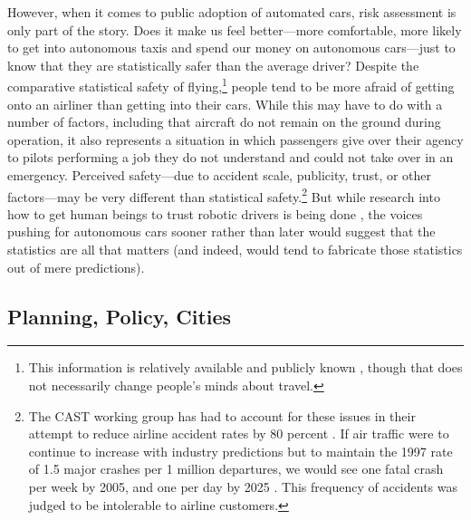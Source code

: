 However, when it comes to public adoption of automated cars,
risk assessment is only part of the story. Does it make us feel better---more
comfortable, more likely to get into autonomous taxis and spend our
money on autonomous cars---just to know that they are statistically safer
than the average driver? Despite the comparative
statistical safety of flying,\footnote{This information is relatively
  available and publicly known \cite{airlinereporter}, though that does not
  necessarily change people's minds about travel.}
people tend to be more afraid of getting onto an airliner than getting into their
cars. While this may have to do with a number of factors,
including that aircraft do not remain on the ground during operation,
it also represents a situation in which passengers give over their
agency to pilots performing a job they do not understand and could not
take over in an emergency. Perceived safety---due to accident scale,
publicity, trust, or other factors---may be very different than statistical
safety.\footnote{The CAST working group has had to account for these
  issues in their attempt to reduce airline accident rates by 80 percent \cite[p.
    28]{PARCCAST}.
If air traffic were to continue to increase
with industry predictions but to maintain the 1997 rate of 1.5 major
crashes per 1 million departures, we would see one fatal crash per
week by 2005, and one per day by 2025 \cite{predictmorecrashes}.
This frequency of accidents was judged to be intolerable to
airline customers.} But while research into how to get human beings to trust robotic drivers
is being done \cite{rossTrust}, the voices pushing for autonomous cars sooner
rather than later would suggest that the statistics are all that
matters (and indeed, would tend to fabricate those statistics out of
mere predictions). 


\subsection{Planning, Policy, Cities}



